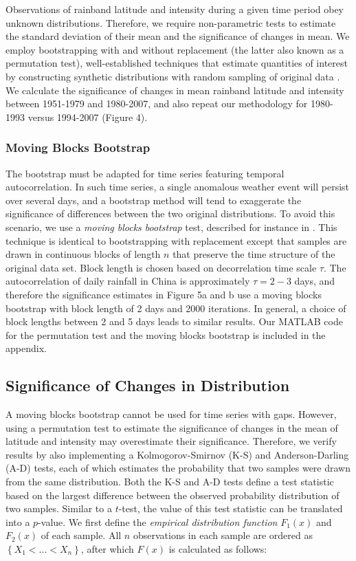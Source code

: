 \documentclass[singlecolumn,11pt]{pnas-new}
\begin{document}
	Observations of rainband latitude and intensity during a given time period obey unknown distributions. Therefore, we require non-parametric tests to estimate the standard deviation of their mean and the significance of changes in mean. We employ bootstrapping with and without replacement (the latter also known as a permutation test), well-established techniques that estimate quantities of interest by constructing synthetic distributions with random sampling of original data \citep{Good2005}. We calculate the significance of changes in mean rainband latitude and intensity between 1951-1979 and 1980-2007, and also repeat our methodology for 1980-1993 versus 1994-2007 (Figure 4).

\subsubsection{Moving Blocks Bootstrap}	
	
	The bootstrap must be adapted for time series featuring temporal autocorrelation. In such time series, a single anomalous weather event will persist over several days, and a bootstrap method will tend to exaggerate the significance of differences between the two original distributions. To avoid this scenario, we use a \textit{moving blocks bootstrap} test, described for instance in \citet{Singh2014}. This technique is identical to bootstrapping with replacement except that samples are drawn in continuous blocks of length $n$ that preserve the time structure of the original data set. Block length is chosen based on decorrelation time scale $\tau$. The autocorrelation of daily rainfall in China is approximately $\tau =2-3$ days, and therefore the significance estimates in Figure 5a and b use a moving blocks bootstrap with block length of 2 days and 2000 iterations. In general, a choice of block lengths between 2 and 5 days leads to similar results. Our MATLAB code for the permutation test and the moving blocks bootstrap is included in the appendix.
	
\subsection{Significance of Changes in Distribution}

	A moving blocks bootstrap cannot be used for time series with gaps. However, using a permutation test to estimate the significance of changes in the mean of latitude and intensity may overestimate their significance. Therefore, we verify results by also implementing a Kolmogorov-Smirnov (K-S) and Anderson-Darling (A-D) tests, each of which estimates the probability that two samples were drawn from the same distribution. Both the K-S and A-D tests define a test statistic based on the largest difference between the observed probability distribution of two samples. Similar to a $t$-test, the value of this test statistic can be translated into a $p$-value. We first define the \textit{empirical distribution function} $F_1(x)$ and $F_2(x)$ of each sample. All $n$ observations in each sample are ordered as $\left\{X_1 < ... < X_n\right\}$, after which $F(x)$ is calculated as follows:
\end{document}
